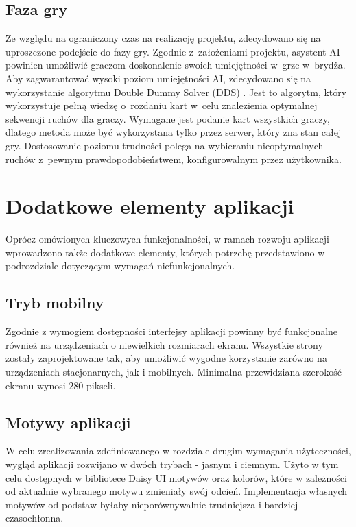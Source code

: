 \FloatBarrier

\subsection{Faza gry}

Ze względu na ograniczony czas na realizację projektu,
zdecydowano się na uproszczone podejście do fazy gry.
Zgodnie z~założeniami projektu, asystent AI powinien umożliwić
graczom doskonalenie swoich umiejętności w~grze w~brydża.
Aby zagwarantować wysoki poziom umiejętności AI, zdecydowano się
na wykorzystanie algorytmu Double Dummy Solver (DDS) \cite{DDS}.
Jest to algorytm, który wykorzystuje pełną wiedzę o~rozdaniu kart
w~celu znalezienia optymalnej sekwencji ruchów dla graczy.
Wymagane jest podanie kart wszystkich graczy, dlatego
metoda może być wykorzystana tylko przez serwer, który zna stan całej gry.
Dostosowanie poziomu trudności polega na wybieraniu nieoptymalnych ruchów
z~pewnym prawdopodobieństwem, konfigurowalnym przez użytkownika.

\section{Dodatkowe elementy aplikacji}

Oprócz omówionych kluczowych funkcjonalności, w ramach rozwoju aplikacji wprowadzono także dodatkowe elementy, 
których potrzebę przedstawiono w podrozdziale dotyczącym wymagań niefunkcjonalnych.

\subsection{Tryb mobilny}

Zgodnie z wymogiem dostępności interfejsy aplikacji powinny być funkcjonalne również na urządzeniach o niewielkich rozmiarach 
ekranu. Wszystkie strony zostały zaprojektowane tak, aby umożliwić wygodne korzystanie 
zarówno na urządzeniach stacjonarnych, jak i mobilnych. Minimalna przewidziana szerokość ekranu wynosi 280 pikseli.

\subsection{Motywy aplikacji}

W celu zrealizowania zdefiniowanego w rozdziale drugim wymagania użyteczności, wygląd aplikacji rozwijano w dwóch trybach - 
jasnym i ciemnym. Użyto w tym celu dostępnych w bibliotece Daisy UI motywów oraz kolorów, które w zależności od aktualnie wybranego motywu 
zmieniały swój odcień. Implementacja własnych motywów od podstaw byłaby nieporównywalnie trudniejsza i bardziej czasochłonna.

